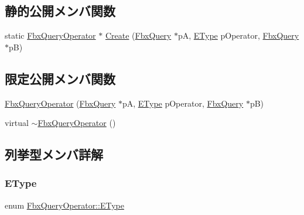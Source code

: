 \subsection*{静的公開メンバ関数}
\begin{DoxyCompactItemize}
\item 
static \hyperlink{class_fbx_query_operator}{Fbx\+Query\+Operator} $\ast$ \hyperlink{class_fbx_query_operator_aa509a5fb63d706c86ec3bc530e21f272}{Create} (\hyperlink{class_fbx_query}{Fbx\+Query} $\ast$pA, \hyperlink{class_fbx_query_operator_aadf25d36a6eab339504a02ce57fd6ad4}{E\+Type} p\+Operator, \hyperlink{class_fbx_query}{Fbx\+Query} $\ast$pB)
\end{DoxyCompactItemize}
\subsection*{限定公開メンバ関数}
\begin{DoxyCompactItemize}
\item 
\hyperlink{class_fbx_query_operator_a8589182ef13c8a61ed084a632269eb48}{Fbx\+Query\+Operator} (\hyperlink{class_fbx_query}{Fbx\+Query} $\ast$pA, \hyperlink{class_fbx_query_operator_aadf25d36a6eab339504a02ce57fd6ad4}{E\+Type} p\+Operator, \hyperlink{class_fbx_query}{Fbx\+Query} $\ast$pB)
\item 
virtual \hyperlink{class_fbx_query_operator_a26d2716be424ac439ed6f1f3b4abf836}{$\sim$\+Fbx\+Query\+Operator} ()
\end{DoxyCompactItemize}


\subsection{列挙型メンバ詳解}
\mbox{\label{class_fbx_query_operator_aadf25d36a6eab339504a02ce57fd6ad4}} 
\subsubsection{\texorpdfstring{E\+Type}{EType}}
{\footnotesize\ttfamily enum \hyperlink{class_fbx_query_operator_aadf25d36a6eab339504a02ce57fd6ad4}{Fbx\+Query\+Operator\+::\+E\+Type}}

